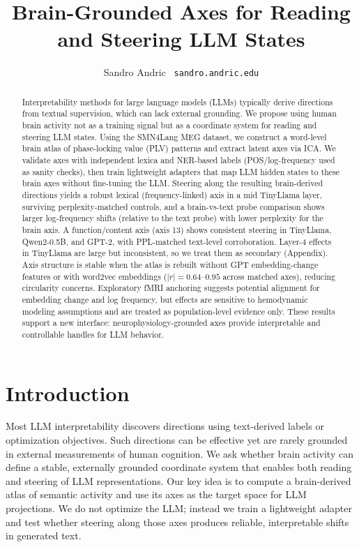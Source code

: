 \documentclass[
]{article}
\title{Brain-Grounded Axes for Reading and Steering LLM States}
\author{Sandro Andric \ \texttt{sandro.andric.edu}}
\date{}
\begin{document}
\maketitle
\begin{abstract}
Interpretability methods for large language models (LLMs) typically
derive directions from textual supervision, which can lack external
grounding. We propose using human brain activity not as a training
signal but as a coordinate system for reading and steering LLM states.
Using the SMN4Lang MEG dataset, we construct a word-level brain atlas of
phase-locking value (PLV) patterns and extract latent axes via ICA. We
validate axes with independent lexica and NER-based labels
(POS/log-frequency used as sanity checks), then train lightweight
adapters that map LLM hidden states to these brain axes without
fine-tuning the LLM. Steering along the resulting brain-derived
directions yields a robust lexical (frequency-linked) axis in a mid
TinyLlama layer, surviving perplexity-matched controls, and a
brain-vs-text probe comparison shows larger log-frequency shifts
(relative to the text probe) with lower perplexity for the brain axis. A
function/content axis (axis 13) shows consistent steering in TinyLlama,
Qwen2-0.5B, and GPT-2, with PPL-matched text-level corroboration.
Layer-4 effects in TinyLlama are large but inconsistent, so we treat
them as secondary (Appendix). Axis structure is stable when the atlas is
rebuilt without GPT embedding-change features or with word2vec
embeddings (\(|r|=0.64–0.95\) across matched axes), reducing circularity
concerns. Exploratory fMRI anchoring suggests potential alignment for
embedding change and log frequency, but effects are sensitive to
hemodynamic modeling assumptions and are treated as population-level
evidence only. These results support a new interface:
neurophysiology-grounded axes provide interpretable and controllable
handles for LLM behavior.
\end{abstract}

\section{Introduction}\label{introduction}

Most LLM interpretability discovers directions using text-derived labels
or optimization objectives. Such directions can be effective yet are
rarely grounded in external measurements of human cognition. We ask
whether brain activity can define a stable, externally grounded
coordinate system that enables both reading and steering of LLM
representations. Our key idea is to compute a brain-derived atlas of
semantic activity and use its axes as the target space for LLM
projections. We do not optimize the LLM; instead we train a lightweight
adapter and test whether steering along those axes produces reliable,
interpretable shifts in generated text.
\end{document}
